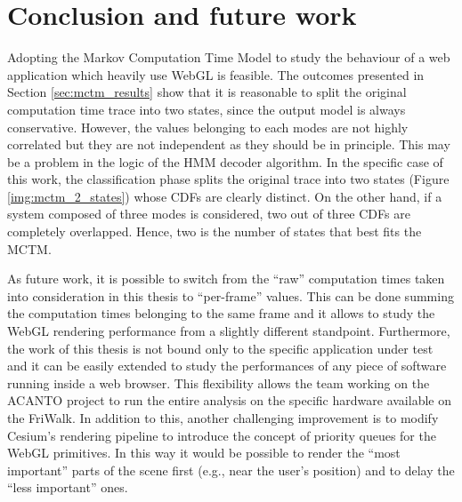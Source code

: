 \chapter{Conclusion and future work} \label{cha:conclusion}

Adopting the Markov Computation Time Model to study the behaviour of a web
application which heavily use WebGL is feasible.
The outcomes presented in Section \ref{sec:mctm_results} show that it is
reasonable to split the original computation time trace into two states, since
the output model is always conservative.
However, the values belonging to each modes are not highly correlated but they
are not independent as they should be in principle.
This may be a problem in the logic of the HMM decoder algorithm. In the specific
case of this work, the classification phase splits the original trace into two
states (Figure \ref{img:mctm_2_states}) whose CDFs are clearly distinct. On the
other hand, if a system composed of three modes is considered, two out of three
CDFs are completely overlapped. Hence, two is the number of states that best
fits the MCTM.

As future work, it is possible to switch from the ``raw'' computation times taken
into consideration in this thesis to ``per-frame'' values. This can be done
summing the computation times belonging to the same frame and it allows to study
the WebGL rendering performance from a slightly different standpoint.
Furthermore, the work of this thesis is not bound only to the specific
application under test and it can be easily extended to study the performances
of any piece of software running inside a web browser. This flexibility allows
the team working on the ACANTO project to run the entire analysis on the
specific hardware available on the FriWalk. In addition to this, another
challenging improvement is to modify Cesium's rendering pipeline to introduce
the concept of priority queues for the WebGL primitives. In this way it would
be possible to render the ``most important'' parts of the scene first (e.g., near
the user's position) and to delay the ``less important'' ones.
